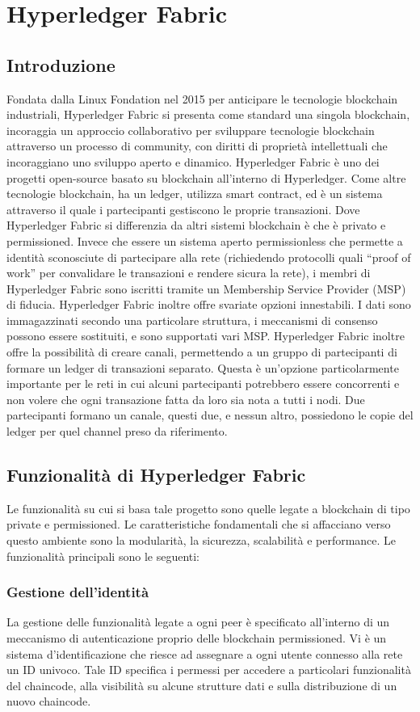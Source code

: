 \chapter{Hyperledger Fabric}
\section{Introduzione}
Fondata dalla Linux Fondation nel 2015 per anticipare le tecnologie blockchain industriali, Hyperledger Fabric si presenta come standard una singola blockchain, incoraggia un approccio collaborativo per sviluppare tecnologie blockchain attraverso un processo di community, con diritti di proprietà intellettuali che incoraggiano uno sviluppo aperto e dinamico.
Hyperledger Fabric è uno dei progetti open-source basato su blockchain all’interno di Hyperledger. Come altre tecnologie blockchain, ha un ledger, utilizza smart contract, ed è un sistema attraverso il quale i partecipanti gestiscono le proprie transazioni.
Dove Hyperledger Fabric si differenzia da altri sistemi blockchain è che è privato e permissioned. Invece che essere un sistema aperto permissionless che permette a identità sconosciute di partecipare alla rete (richiedendo protocolli quali “proof of work” per convalidare le transazioni e rendere sicura la rete), i membri di Hyperledger Fabric sono iscritti tramite un Membership Service Provider (MSP) di fiducia.
Hyperledger Fabric inoltre offre svariate opzioni innestabili. I dati sono immagazzinati secondo una particolare struttura, i meccanismi di consenso possono essere sostituiti, e sono supportati vari MSP.
Hyperledger Fabric inoltre offre la possibilità di creare canali, permettendo a un gruppo di partecipanti di formare un ledger di transazioni separato. Questa è un’opzione particolarmente importante per le reti in cui alcuni partecipanti potrebbero essere concorrenti e non volere che ogni transazione fatta da loro sia nota a tutti i nodi. Due partecipanti formano un canale, questi due, e nessun altro, possiedono le copie del ledger per quel channel preso da riferimento.
\newpage
\section{Funzionalità di Hyperledger Fabric}
Le funzionalità su cui si basa tale progetto sono quelle legate a blockchain di tipo private e permissioned. Le caratteristiche fondamentali che si affacciano verso questo ambiente sono la modularità, la sicurezza, scalabilità e performance. Le funzionalità principali sono le seguenti:
\subsection{Gestione dell'identità}
La gestione delle funzionalità legate a ogni peer è specificato all'interno di un meccanismo di autenticazione proprio delle blockchain permissioned. Vi è un sistema d'identificazione che riesce ad assegnare a ogni utente connesso alla rete un ID univoco. Tale ID specifica i permessi per accedere a particolari funzionalità del chaincode, alla visibilità su alcune strutture dati e sulla distribuzione di un nuovo chaincode.

